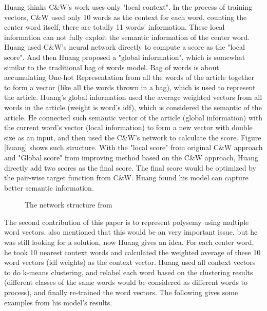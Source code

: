 Huang thinks C$\&$W's work uses only "local context". In the process of training vectors, C$\&$W used only 10 words as the context for each word, counting the center word itself, there are totally 11 words' information. 
These local information can not fully exploit the semantic information of the center word. Huang used C$\&$W's neural network directly to compute a score as the "local score". 
And then Huang proposed a "global information", which is somewhat similar to the traditional bag of words model. Bag of words is about accumulating One-hot Representation from all the words of the article together to form a vector (like all the words thrown in a bag), which is used to represent the article. Huang's global information used the average weighted vectors from all words in the article (weight is word's idf), which is considered the semantic of the article. 
He connected such semantic vector of the article (global information) 
with the current word's vector (local information) to form a new vector with double size as an input, and then used the C$\&$W's network to calculate the score. Figure [huang] shows such structure.
With the "local score" from original C$\&$W approach and "Global score" from improving method based on the C$\&$W approach, Huang directly add two scores as the final score. The final score would be optimized by the pair-wise target function from C$\&$W. Huang found his model can capture better semantic information. \\

\begin{figure}[!ht]
  \centering
	\caption{The network structure from \citep{huang2012improving}}
	\label{fig:huang}
\end{figure}


The second contribution of this paper is to represent polysemy using multiple word vectors. \citep{bengio2003neural} also mentioned that this would be an very important issue, but he was still looking for a solution, now Huang gives an idea. For each center word, he took 10 nearest context words and calculated the weighted average of these 10 word vectors (idf weights) as the context vector. Huang used all context vectors to do k-means clustering, and relabel  each word based on the clustering results (different classes of the same words would be considered as different words to process), and finally re-trained the word vectors. The following gives some examples from his model's results.\\

